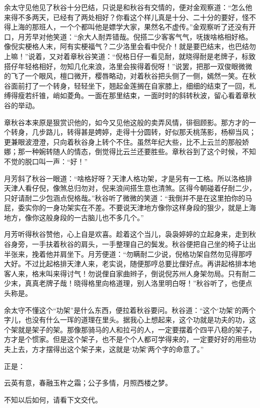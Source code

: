 \documentclass[12pt,UTF8]{ctexbook}
\begin{document}
{{{余太守见他见了秋谷十分巴结，只说是和秋谷有交情的，便对金观察道：“怎么他来得不多两天，已经有了两处相好？你看这个样儿真是十分、二十分的要好，怪不得上海的那班人，一个个都叫他是嫖学大家，果然名不虚传。”金观察听了还没有开口，月芳早对他笑道：“余大人耐弄错哉。倪搭二少客客气气，呒拨啥格相好格。像倪实梗格人末，阿有实梗福气？二少洛里会看中倪介！就是要巴结末，也巴结勿上嘛！”说着，又对着章秋谷笑道：“倪格日仔一看见耐，就晓得耐是老牌子，标致搭仔年轻格相好，勿知几化来浪，洛里会挨得着倪呀！”说罢，把那一双俊眼微微的飞了一个眼风，檀口微开，樱唇略动，对着秋谷把头侧了一侧，嫣然一笑。在秋谷面前打了一个转身，轻轻坐下，翘起金莲搁在自家膝上，细细的结束了一回，札缚得瘦若纤锥，峭如菱角。一面在那里结束，一面时时的斜转秋波，留心看着章秋谷的举动。

章秋谷本来原是狠赏识他的，如今又见他这般的卖弄风情，徘徊顾影。那方才的一个转身，几步路儿，转得甚是娉婷，走得十分圆转，好似那夭桃荡影，杨柳当风；更兼眼波澄澄，只向着秋谷身上转个不住。虽然年纪大些，比不上云兰的那般娇娜；那一种婉转随人的情态，倒觉得比云兰还要胜些。章秋谷到了这个时候，不知不觉的脱口叫一声：“好！”

月芳斜了秋谷一眼道：“啥格好呀？天津人格功架，才是另有一工格。所以洛格排天津人看仔倪，像煞总归勿对，倪来浪间搭生意也清煞。区得今朝碰着仔耐二少，只好请耐二少包涵点倪格哉。”秋谷听了微微的笑道：“我倒并不是在这里拍你的马屁，委实你的一身功架实在不差。不要说天津地方像你这样身段的狠少，就是上海地方，像你这般身段的一古脑儿也不多几个。”

月芳听得秋谷赞他，心上自是欢喜。趁着这个当儿，袅袅婷婷的立起身来，走到秋谷身旁，一手扶着秋谷的肩头，一手整理自己的鬓发。秋谷便把自己坐的椅子让出半张来，挽着他并肩坐下。月芳便道：“勿瞒耐二少说，倪格功架自然勿见得那哼大好。不过比起格排天津人来，老实说，随便那哼总要比俚好点。再讲起格排本地客人来，格末叫来得讨气！勿说俚自家曲辫子，倒说倪苏州人身架勿局。只有耐二少末，真真老牌子哉！晓得格里向格道理，别人洛里明白呀！”秋谷听了，也便点头称是。

余太守不懂这个“功架”是什么东西，便拉着秋谷要问。秋谷道：“这个‘功架’的两个字儿，也没有什么一珲的道理在里头。据我心上想起来，这个功就是功夫的功，这个架就是架子的架。那像那骑马的人和拉弓的人，一定要摆着个四平八稳的架子，方才是个惯家。但是这个架子，也不是个个人都可学得来的，一定要好好的用些功夫上去，方才摆得出这个架子来，这就是‘功架’两个字的命意了。”

正是：

云英有意，春融玉杵之霜；公子多情，月照西楼之梦。

不知以后如何，请看下文交代。





}}}
\end{document}
